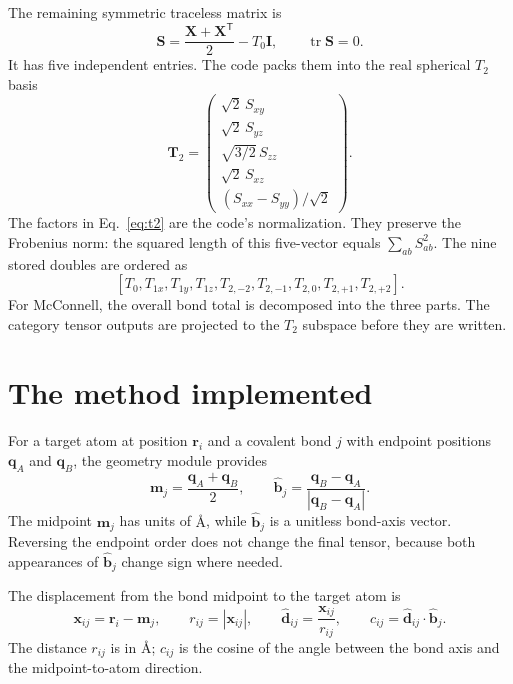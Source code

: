 \documentclass[11pt]{article}
\begin{document}
The remaining symmetric traceless matrix is
\begin{equation}
  \bm S =
  \frac{\bm X+\bm X^{\mathsf T}}{2}
  - T_0\bm I ,
  \qquad \operatorname{tr}\bm S = 0 .
  \label{eq:symmetric-traceless}
\end{equation}
It has five independent entries. The code packs them into the real spherical
\(T_2\) basis
\begin{equation}
  \bm T_2 =
  \begin{pmatrix}
    \sqrt{2}\,S_{xy}\\
    \sqrt{2}\,S_{yz}\\
    \sqrt{3/2}\,S_{zz}\\
    \sqrt{2}\,S_{xz}\\
    (S_{xx}-S_{yy})/\sqrt{2}
  \end{pmatrix}.
  \label{eq:t2}
\end{equation}
The factors in Eq.~\eqref{eq:t2} are the code's normalization. They preserve
the Frobenius norm: the squared length of this five-vector equals
\(\sum_{ab}S_{ab}^2\). The nine stored doubles are ordered as
\[
  [T_0,T_{1x},T_{1y},T_{1z},
    T_{2,-2},T_{2,-1},T_{2,0},T_{2,+1},T_{2,+2}] .
\]
For McConnell, the overall bond total is decomposed into the three parts. The
category tensor outputs are projected to the \(T_2\) subspace before they are
written.

\section{The method implemented}

For a target atom at position \(\bm r_i\) and a covalent bond \(j\) with endpoint
positions \(\bm q_A\) and \(\bm q_B\), the geometry module provides
\begin{equation}
  \bm m_j = \frac{\bm q_A+\bm q_B}{2}, \qquad
  \hat{\bm b}_j =
  \frac{\bm q_B-\bm q_A}{|\bm q_B-\bm q_A|}.
  \label{eq:bond-geometry}
\end{equation}
The midpoint \(\bm m_j\) has units of \(\si{\angstrom}\), while
\(\hat{\bm b}_j\) is a unitless bond-axis vector. Reversing the endpoint order
does not change the final tensor, because both appearances of
\(\hat{\bm b}_j\) change sign where needed.

The displacement from the bond midpoint to the target atom is
\begin{equation}
  \bm x_{ij} = \bm r_i-\bm m_j,\qquad
  r_{ij}=|\bm x_{ij}|,\qquad
  \hat{\bm d}_{ij}=\frac{\bm x_{ij}}{r_{ij}},\qquad
  c_{ij}=\hat{\bm d}_{ij}\cdot \hat{\bm b}_j .
  \label{eq:relative-geometry}
\end{equation}
The distance \(r_{ij}\) is in \(\si{\angstrom}\); \(c_{ij}\) is the cosine of
the angle between the bond axis and the midpoint-to-atom direction.
\end{document}
